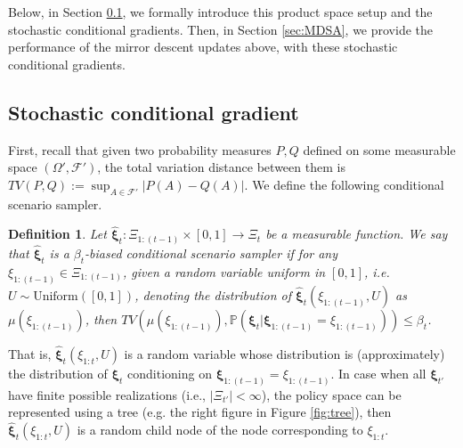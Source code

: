 \documentclass[11pt,fullpage,letterpaper]{article}
\newcommand{\mc}{\mathcal}
\newcommand{\mb}{\mathbf}
\newcommand{\E}{\mathbb{E}}
\newcommand{\p}{\mathbb{P}}
\newcommand{\bx}{\boldsymbol{\xi}}
\newcommand{\internal}{\mathsf{int}}
\newtheorem{definition}{Definition}[section]
\begin{document}

Below, in Section \ref{sec:def-grad-cvx}, we formally introduce this product space setup and the stochastic conditional gradients. Then, in Section \ref{sec:MDSA}, we provide the performance of the mirror descent updates above, with these stochastic conditional gradients. 




\subsection{Stochastic conditional gradient}\label{sec:def-grad-cvx}
First, recall that given two probability measures $P,Q$ defined on some measurable space $(\Omega',\mc F')$, the total variation distance between them is $TV(P,Q):=\sup_{A\in \mc  F'} |P(A)-Q(A)|$. We define the following conditional scenario sampler. 
\begin{definition}\label{def:conditional-scenario-sampler}
    Let $\widehat{\bx}_t:\Xi_{1:(t-1)}\times [0,1]\to \Xi_t$ be a measurable function. We say that $\widehat{\bx}_t$ is a $\beta_t$-biased \textit{conditional scenario sampler} if for any $\xi_{1:(t-1)}\in \Xi_{1:(t-1)}$, given a random variable uniform in $[0,1]$, i.e. $U\sim \text{Uniform}([0,1])$, denoting the distribution of $\widehat{\bx}_t(\xi_{1:(t-1)},U)$ as $\mu(\xi_{1:(t-1)})$, then $TV(\mu(\xi_{1:(t-1)}),\p(\bx_t|\bx_{1:(t-1)} = \xi_{1:(t-1)}))\leq \beta_t$. 
\end{definition}

That is, $\widehat{\bx}_t(\xi_{1:t},U)$ is a random variable whose distribution is (approximately) the distribution of $\bx_{t}$ conditioning on $\bx_{1:(t-1)} = \xi_{1:(t-1)}$. In case when all $\bx_{t'}$ have finite possible realizations (i.e., $|\Xi_{t'}|<\infty$), the policy space can be represented using a tree (e.g. the right figure in Figure \ref{fig:tree}), then $\widehat{\bx}_t(\xi_{1:t},U)$ is a random child node of the node corresponding to $\xi_{1:t}$. 
\end{document}
